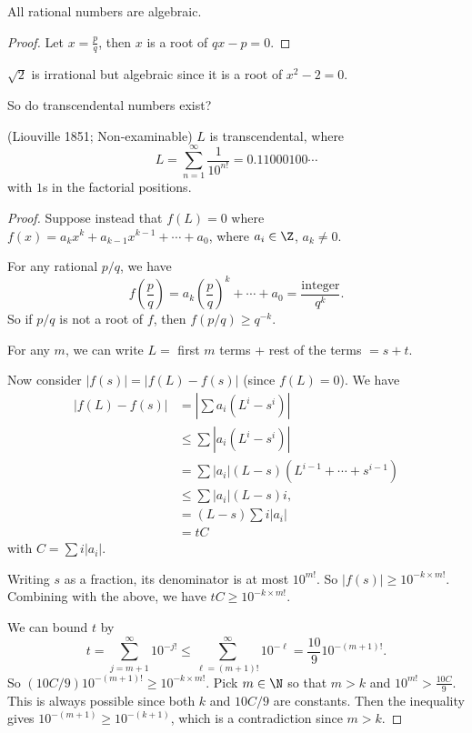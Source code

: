 \documentclass[a4paper]{article}
\begin{document}
\begin{prop}
  All rational numbers are algebraic.
\end{prop}

\begin{proof}
  Let $x = \frac{p}{q}$, then $x$ is a root of $qx - p = 0$.
\end{proof}

\begin{eg}
  $\sqrt{2}$ is irrational but algebraic since it is a root of $x^2 - 2 = 0$.
\end{eg}

So do transcendental numbers exist?
\begin{thm}
  (Liouville 1851; Non-examinable) $L$ is transcendental, where
  \[
    L = \sum_{n = 1}^\infty \frac{1}{10^{n!}} = 0.11000100\cdots
  \]
  with $1$s in the factorial positions.
\end{thm}

\begin{proof}
  Suppose instead that $f(L) = 0$ where $f(x) = a_kx^k + a_{k -1}x^{k - 1} + \cdots + a_0$, where $a_i\in \Z$, $a_k\not= 0$.

  For any rational $p/q$, we have
  \[
    f\left(\frac{p}{q}\right) = a_k\left(\frac{p}{q}\right)^k + \cdots + a_0 = \frac{\text{integer}}{q^k}.
  \]
  So if $p/q$ is not a root of $f$, then $f(p/q) \geq q^{-k}$.

  For any $m$, we can write $L = $ first $m$ terms + rest of the terms $ = s + t$.

  Now consider $|f(s)| = |f(L) - f(s)|$ (since $f(L) = 0$). We have
  \begin{align*}
    |f(L) - f(s)| &= \left|\sum a_i(L^i - s^i)\right|\\
    &\leq \sum |a_i(L^i - s^i)|\\
    &= \sum |a_i|(L - s)(L^{i - 1} + \cdots + s^{i - 1})\\
    &\leq \sum |a_i|(L - s)i,\\
    &= (L - s)\sum i|a_i|\\
    &= tC
  \end{align*}
  with $C = \sum i|a_i|$.

  Writing $s$ as a fraction, its denominator is at most $10^{m!}$. So $|f(s)| \geq 10^{-k\times m!}$. Combining with the above, we have $tC \geq 10^{-k\times m!}$.

  We can bound $t$ by
  \[
    t = \sum_{j = m + 1}^\infty 10^{-j!} \leq \sum_{\ell = (m + 1)!}^\infty 10^{-\ell} = \frac{10}{9}10^{-(m + 1)!}.
  \]
  So $(10C/9)10^{-(m + 1)!} \geq 10^{-k\times m!}$. Pick $m\in \N$ so that $m > k$ and $10^{m!} > \frac{10C}{9}$. This is always possible since both $k$ and $10C/9$ are constants. Then the inequality gives $10^{-(m + 1)} \geq 10^{-(k + 1)}$, which is a contradiction since $m > k$.
\end{proof}
\end{document}
